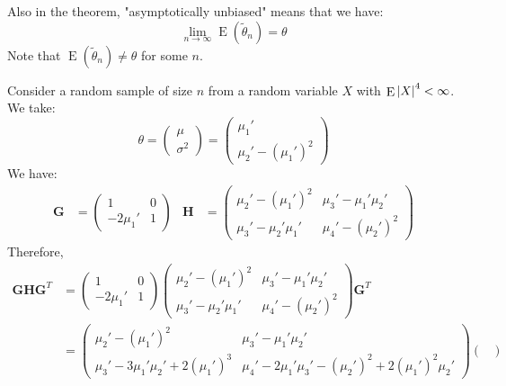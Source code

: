 \documentclass{huhtakm-template-book-v2}
\DeclareMathOperator{\E}{E}
\begin{document}
\newpage
\begin{rem}
	Also in the theorem, "asymptotically unbiased" means that we have:
	\begin{equation*}
		\lim_{n\to\infty}\E(\widetilde{\theta}_{n})=\theta
	\end{equation*}
	Note that $\E(\widetilde{\theta}_{n})\neq\theta$ for some $n$.
\end{rem}
\begin{eg}
	Consider a random sample of size $n$ from a random variable $X$ with $\E\abs{X}^{4}<\infty$. We take:
	\begin{equation*}
		\theta=\begin{pmatrix}
			\mu\\ \sigma^{2}
		\end{pmatrix}=\begin{pmatrix}
			\mu_{1}'\\ \mu_{2}'-(\mu_{1}')^{2}
		\end{pmatrix}
	\end{equation*}
	We have:
	\begin{align*}
		\mathbf{G}&=\begin{pmatrix}
			1 & 0\\
			-2\mu_{1}' & 1
		\end{pmatrix} & \mathbf{H}&=\begin{pmatrix}
			\mu_{2}'-(\mu_{1}')^{2} & \mu_{3}'-\mu_{1}'\mu_{2}'\\
			\mu_{3}'-\mu_{2}'\mu_{1}' & \mu_{4}'-(\mu_{2}')^{2}
		\end{pmatrix}
	\end{align*}
	Therefore,
	\begin{align*}
		\mathbf{GHG}^{T}&=\begin{pmatrix}
			1 & 0\\
			-2\mu_{1}' & 1
		\end{pmatrix}\begin{pmatrix}
		\mu_{2}'-(\mu_{1}')^{2} & \mu_{3}'-\mu_{1}'\mu_{2}'\\
		\mu_{3}'-\mu_{2}'\mu_{1}' & \mu_{4}'-(\mu_{2}')^{2}
		\end{pmatrix}\mathbf{G}^{T}\\
		&=\begin{pmatrix}
			\mu_{2}'-(\mu_{1}')^{2} & \mu_{3}'-\mu_{1}'\mu_{2}'\\
			\mu_{3}'-3\mu_{1}'\mu_{2}'+2(\mu_{1}')^{3} & \mu_{4}'-2\mu_{1}'\mu_{3}'-(\mu_{2}')^{2}+2(\mu_{1}')^{2}\mu_{2}'
		\end{pmatrix}\begin{pmatrix}

\end{pmatrix}
\end{align*}
\end{eg}
\end{document}
